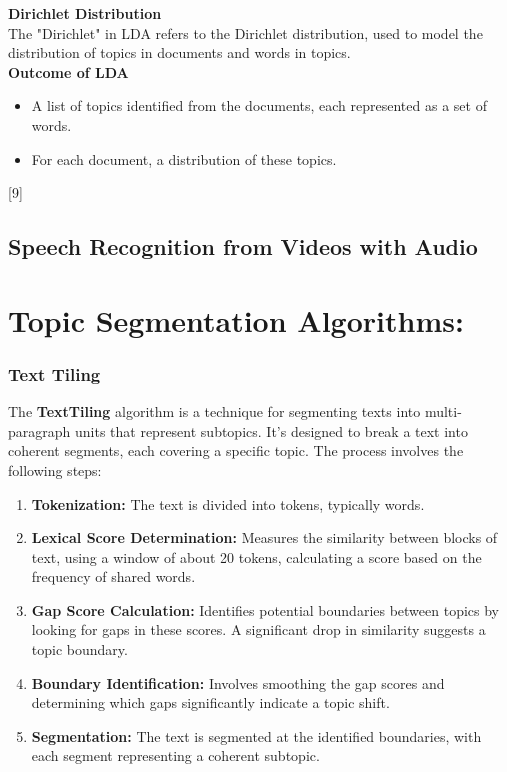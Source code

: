 \textbf{Dirichlet Distribution} \\
The "Dirichlet" in LDA refers to the Dirichlet distribution, used to model the distribution of topics in documents and words in topics.\\


\textbf{Outcome of LDA}
\begin{itemize}
    \item A list of topics identified from the documents, each represented as a set of words.
    \item For each document, a distribution of these topics.
\end{itemize} [9]



\subsection{Speech Recognition from Videos with Audio}






\section{Topic Segmentation Algorithms:}

\subsubsection{Text Tiling}

The \textbf{TextTiling} algorithm is a technique for segmenting texts into multi-paragraph units that represent subtopics. It's designed to break a text into coherent segments, each covering a specific topic. The process involves the following steps:

\begin{enumerate}
    \item \textbf{Tokenization:} The text is divided into tokens, typically words.
    \item \textbf{Lexical Score Determination:} Measures the similarity between blocks of text, using a window of about 20 tokens, calculating a score based on the frequency of shared words.
    \item \textbf{Gap Score Calculation:} Identifies potential boundaries between topics by looking for gaps in these scores. A significant drop in similarity suggests a topic boundary.
    \item \textbf{Boundary Identification:} Involves smoothing the gap scores and determining which gaps significantly indicate a topic shift.
    \item \textbf{Segmentation:} The text is segmented at the identified boundaries, with each segment representing a coherent subtopic.
\end{enumerate}

